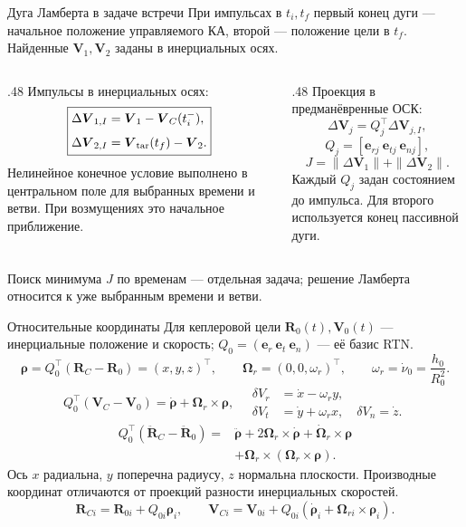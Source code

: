 \documentclass[11pt,aspectratio=169,t]{beamer}
\newcommand{\eqcompact}{\fontsize{10}{12}\selectfont}
\newcommand{\derivationmathspacing}{%
  \setlength{\abovedisplayskip}{2pt}%
  \setlength{\belowdisplayskip}{3pt}%
  \setlength{\abovedisplayshortskip}{2pt}%
  \setlength{\belowdisplayshortskip}{2pt}%
  \setlength{\jot}{2pt}}
\newcommand{\vect}[1]{\boldsymbol{#1}}
\begin{document}
\begin{frame}{Дуга Ламберта в задаче встречи}
\relax\derivationmathspacing
\justifying
При импульсах в $t_i,t_f$ первый конец дуги --- начальное положение управляемого КА,
второй --- положение цели в $t_f$. Найденные $\vect V_1,\vect V_2$ заданы в инерциальных осях.
\begin{columns}[T,onlytextwidth]
\begin{column}{.48\textwidth}
Импульсы в инерциальных осях:
{\eqcompact\derivationmathspacing
\[
 \boxed{\begin{aligned}
 \Delta\vect V_{1,I}&=\vect V_1-\vect V_C(t_i^-),\\[4pt]
 \Delta\vect V_{2,I}&=\vect V_{\rm tar}(t_f)-\vect V_2.
 \end{aligned}}
\]
}
\justifying
Нелинейное конечное условие выполнено в центральном поле для выбранных времени и ветви.
При возмущениях это начальное приближение.
\end{column}
\begin{column}{.48\textwidth}
Проекция в предманёвренные ОСК:
{\eqcompact\derivationmathspacing
\[
 \Delta\vect V_j=Q_j^\top\Delta\vect V_{j,I},
\]
\[
 Q_j=[\vect e_{rj}\ \vect e_{tj}\ \vect e_{nj}],
\]
\[
 J=\|\Delta\vect V_1\|+\|\Delta\vect V_2\|.
\]
}
\justifying
Каждый $Q_j$ задан состоянием до импульса.
Для второго используется конец пассивной дуги.
\end{column}
\end{columns}
\smallskip
Поиск минимума $J$ по временам --- отдельная задача;
решение Ламберта относится к уже выбранным времени и ветви.
\end{frame}


\begin{frame}{Относительные координаты}
\relax
\derivationmathspacing
Для кеплеровой цели $\vect R_0(t),\vect V_0(t)$ --- инерциальные положение и скорость;
$Q_0=(\vect e_r\ \vect e_t\ \vect e_n)$ --- её базис RTN.
{\eqcompact\derivationmathspacing
\[
 \vect\rho=Q_0^\top(\vect R_C-\vect R_0)=(x,y,z)^\top,
 \qquad \vect\Omega_r=(0,0,\omega_r)^\top,\qquad
 \omega_r=\dot\nu_0=\frac{h_0}{R_0^2}.
\]
\[
 Q_0^\top(\vect V_C-\vect V_0)
 =\dot{\vect\rho}+\vect\Omega_r\times\vect\rho,
 \quad
 \begin{aligned}
 \delta V_r&=\dot x-\omega_r y,\\
 \delta V_t&=\dot y+\omega_r x,\quad \delta V_n=\dot z.
 \end{aligned}
\]
\[
\begin{aligned}
 Q_0^\top(\ddot{\vect R}_C-\ddot{\vect R}_0)
 ={}&\ddot{\vect\rho}+2\vect\Omega_r\times\dot{\vect\rho}
 +\dot{\vect\Omega}_r\times\vect\rho\\[-1pt]
 &+\vect\Omega_r\times(\vect\Omega_r\times\vect\rho).
\end{aligned}
\]
}
\justifying
Ось $x$ радиальна, $y$ поперечна радиусу, $z$ нормальна плоскости.
Производные координат отличаются от проекций разности инерциальных скоростей.
{\eqcompact\derivationmathspacing
\[
 \vect R_{Ci}=\vect R_{0i}+Q_{0i}\vect\rho_i,\qquad
 \vect V_{Ci}=\vect V_{0i}
 +Q_{0i}(\dot{\vect\rho}_i+\vect\Omega_{ri}\times\vect\rho_i).
\]
}
\end{frame}
\end{document}
